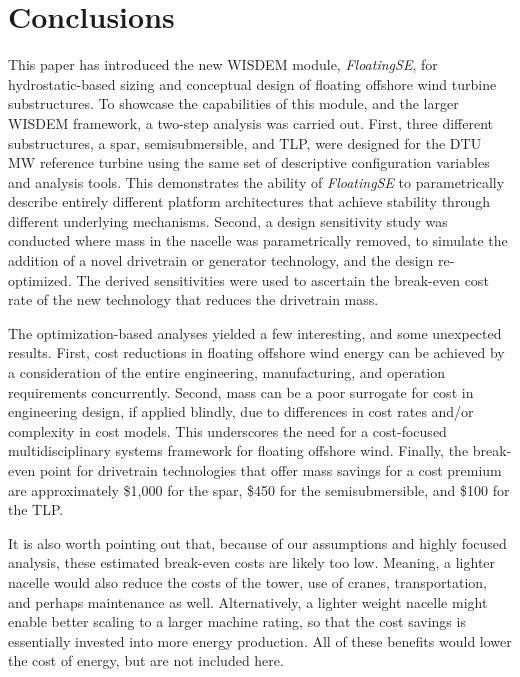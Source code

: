 \chapter{Conclusions}
\label{sec:conc}

This paper has introduced the new WISDEM module, \textit{FloatingSE},
for hydrostatic-based sizing and conceptual design of floating offshore
wind turbine substructures.  To showcase the capabilities of this
module, and the larger WISDEM framework, a two-step analysis was carried
out.  First, three different substructures, a spar, semisubmersible, and
TLP, were designed for the DTU \unit[10]{MW} reference turbine using the
same set of descriptive configuration variables and analysis tools.  This
demonstrates the ability of \textit{FloatingSE} to parametrically
describe entirely different platform architectures that achieve
stability through different underlying mechanisms.  Second, a design
sensitivity study was conducted where mass in the nacelle was
parametrically removed, to simulate the addition of a novel drivetrain
or generator technology, and the design re-optimized.  The derived
sensitivities were used to ascertain the break-even cost rate of the new
technology that reduces the drivetrain mass.

The optimization-based analyses yielded a few interesting, and some
unexpected results.  First, cost reductions in floating offshore wind
energy can be achieved by a consideration of the entire engineering,
manufacturing, and operation requirements concurrently.  Second, mass
can be a poor surrogate for cost in engineering design, if applied
blindly, due to differences in cost rates and/or complexity in cost
models.  This underscores the need for a cost-focused multidisciplinary
systems framework for floating offshore wind.  Finally, the break-even
point for drivetrain technologies that offer mass savings for a cost
premium are approximately \$1,000 for the spar, \$450 for the
semisubmersible, and \$100 for the TLP.

It is also worth pointing out that, because of our assumptions and
highly focused analysis, these estimated break-even costs are
likely too low.  Meaning, a lighter nacelle would also reduce the costs
of the tower, use of cranes, transportation, and perhaps maintenance as
well.  Alternatively, a lighter weight nacelle might enable better
scaling to a larger machine rating, so that the cost savings is
essentially invested into more energy production.  All of these benefits
would lower the cost of energy, but are not included here.

